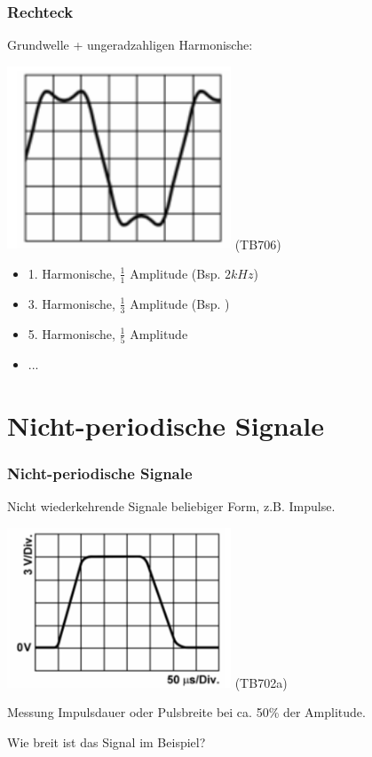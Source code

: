 \begin{frame}
    \frametitle{Rechteck}

    Grundwelle + ungeradzahligen Harmonische:


    \begin{center}
        \includegraphics[width=0.5\textwidth]{a11/TB706.png}
        \tiny (TB706)
    \end{center}

     \begin{itemize}
        \item 1. Harmonische, $\frac{1}{1}$ Amplitude (Bsp. $2kHz$)
        \item 3. Harmonische, $\frac{1}{3}$ Amplitude (Bsp. 
                                                            )
        \item 5. Harmonische, $\frac{1}{5}$ Amplitude
        \item ...
    \end{itemize}
   

\end{frame}

\section{Nicht-periodische Signale}

\begin{frame}
    \frametitle{Nicht-periodische Signale}

    Nicht wiederkehrende Signale beliebiger Form, z.B. Impulse.

    \begin{center}
        \includegraphics[width=0.5\textwidth]{a11/TB702a.png}
        \tiny (TB702a)
    \end{center}

    Messung Impulsdauer oder Pulsbreite bei ca. 50\% der Amplitude.
    
    Wie breit ist das Signal im Beispiel?

\end{frame}

